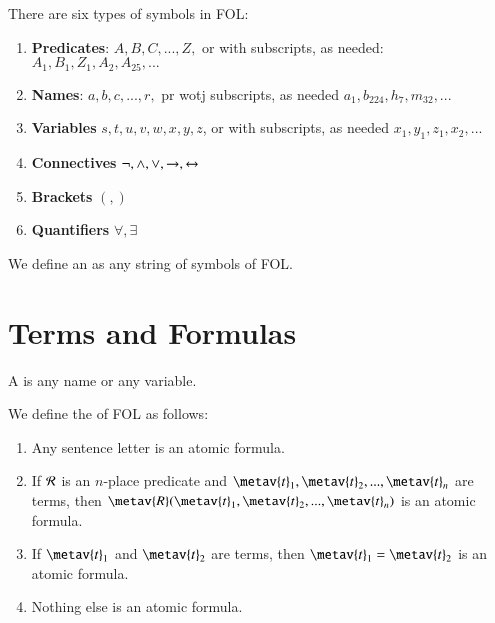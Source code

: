 \documentclass[12pt, a4paper, twoside, openright, titlepage]{book}
\begin{document}
\begin{defn}{}{}
    There are six types of symbols in FOL: \begin{enumerate}
        \item \textbf{Predicates}: $A,B,C,...,Z,$ or with subscripts, as needed: $A_1,B_1,Z_1,A_2,A_{25},...$
        \item \textbf{Names}: $a,b,c,...,r,$ pr wotj subscripts, as needed $a_1,b_{224},h_7,m_{32},...$
        \item \textbf{Variables} $s,t,u,v,w,x,y,z$, or with subscripts, as needed $x_1,y_1,z_1,x_2,...$
        \item \textbf{Connectives} $\neg, \wedge, \vee, \rightarrow, \leftrightarrow$
        \item \textbf{Brackets} $(,)$
        \item \textbf{Quantifiers} $\forall,\exists$
    \end{enumerate}
    We define an  as any string of symbols of FOL.
\end{defn}


\section{\textsection Terms and Formulas}

\begin{defn}{}{}
    A  is any name or any variable.
\end{defn}


\begin{defn}{}{}
    We define the  of FOL as follows: \begin{enumerate}
        \item Any sentence letter is an atomic formula.
        \item If $\mathcal{R}$ is an $n$-place predicate and $\metav{t}_1,\metav{t}_2,...,\metav{t}_n$ are terms, then $\metav{R}(\metav{t}_1,\metav{t}_2,...,\metav{t}_n)$ is an atomic formula.
        \item If $\metav{t}_1$ and $\metav{t}_2$ are terms, then $\metav{t}_1 = \metav{t}_2$ is an atomic formula.
        \item Nothing else is an atomic formula.
    \end{enumerate}
\end{defn}
\end{document}
